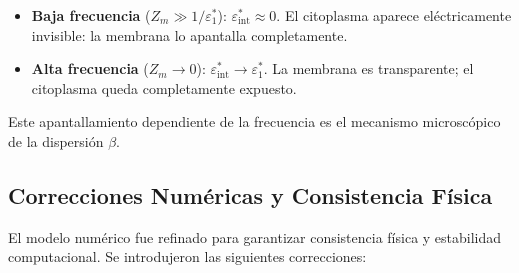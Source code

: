 \documentclass[12pt]{article}
\begin{document}
\begin{itemize}
\item \textbf{Baja frecuencia} ($Z_m \gg 1/\varepsilon_1^*$):
$\varepsilon_{\text{int}}^* \approx 0$. El citoplasma aparece el\'ectricamente
invisible: la membrana lo apantalla completamente.
\item \textbf{Alta frecuencia} ($Z_m \to 0$): $\varepsilon_{\text{int}}^* \to
\varepsilon_1^*$. La membrana es transparente; el citoplasma queda completamente
expuesto.
\end{itemize}

Este apantallamiento dependiente de la frecuencia es el mecanismo microsc\'opico de la
dispersi\'on $\beta$.

\subsection{Correcciones Num\'ericas y Consistencia F\'isica}
\label{sec:numerical_corrections}

El modelo num\'erico fue refinado para garantizar consistencia f\'isica y
estabilidad computacional. Se introdujeron las siguientes correcciones:
\end{document}
